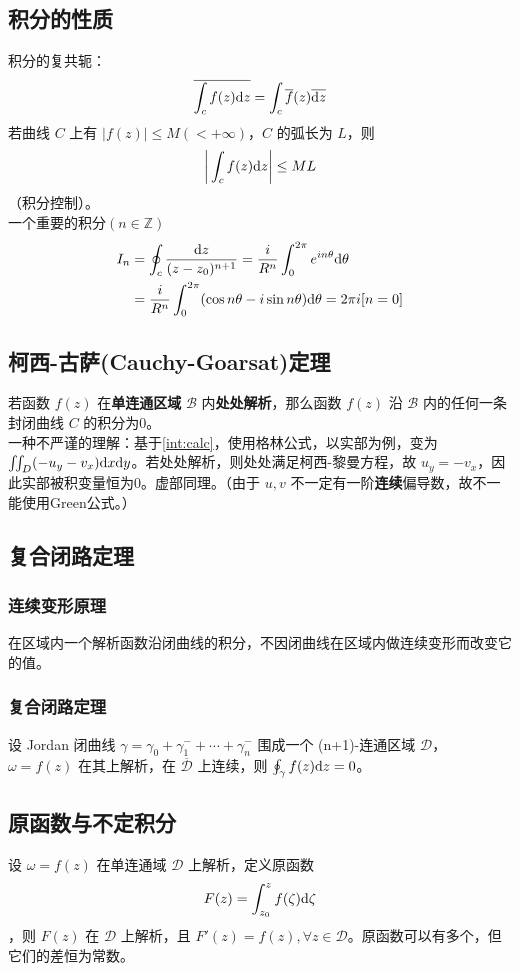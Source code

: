 \documentclass[./main.tex]{subfiles}
\begin{document}
\subsection{积分的性质}
积分的复共轭：
\begin{equation}
    \overline{\int_cf(z)\text{d}z}=\int_c\overline{f}(z)\overline{\text{d}z}
\end{equation}
若曲线 $C$ 上有 $\big|f(z)\big|\le M(<+\infty)$，$C$ 的弧长为 $L$，则 \begin{equation}\bigg|\int_cf(z)\text{d}z\bigg|\le ML\end{equation}（积分控制）。\\
\indent 一个重要的积分$(n\in\mathbb{Z})$
\begin{align}\label{equ:simpleint}
I_n&=\oint_c\frac{\text{d}z}{(z-z_0)^{n+1}}=\frac{i}{R^n}\int_0^{2\pi}e^{in\theta}\text{d}\theta\notag\\&=\frac{i}{R^n}\int_0^{2\pi}(\cos n\theta-i\sin n\theta)\text{d}\theta=2\pi i[n=0]
\end{align}
\subsection{柯西-古萨(Cauchy-Goarsat)定理}
若函数 $f(z)$ 在\textbf{单连通区域} $\mathscr{B}$ 内\textbf{处处解析}，那么函数 $f(z)$ 沿 $\mathscr{B}$ 内的任何一条封闭曲线 $C$ 的积分为0。\\
\indent 一种不严谨的理解：基于\eqref{int:calc}，使用格林公式，以实部为例，变为 $\iint_D(-u_y-v_x)\text{d}x\text{d}y$。若处处解析，则处处满足柯西-黎曼方程，故 $u_y=-v_x$，因此实部被积变量恒为0。虚部同理。（由于 $u,v$ 不一定有一阶\textbf{连续}偏导数，故不一能使用Green公式。）
\subsection{复合闭路定理}
\subsubsection{连续变形原理}
在区域内一个解析函数沿闭曲线的积分，不因闭曲线在区域内做连续变形而改变它的值。
\subsubsection{复合闭路定理}
设 Jordan 闭曲线 $\gamma=\gamma_0+\gamma_1^-+\cdots+\gamma_n^-$ 围成一个 (n+1)-连通区域 $\mathscr{D}$， $\omega=f(z)$ 在其上解析，在 $\overline{\mathscr{D}}$ 上连续，则 $\oint_{\gamma}f(z)\text{d}z=0$。
\subsection{原函数与不定积分}
设 $\omega=f(z)$ 在单连通域 $\mathscr{D}$ 上解析，定义原函数 $$F(z)=\int_{z_0}^zf(\zeta)\text{d}\zeta$$，则 $F(z)$ 在 $\mathscr{D}$ 上解析，且 $F'(z)=f(z),\forall z\in \mathscr{D}$。原函数可以有多个，但它们的差恒为常数。
\end{document}
